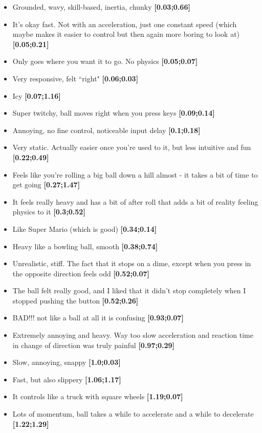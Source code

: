 \begin{itemize}[noitemsep,nolistsep]
\item Grounded, wavy, skill-based, inertia, chunky \textbf{[0.03;0.66]}
\item It's okay fast. Not with an acceleration, just one constant speed (which maybe makes it easier to control but then again more boring to look at) \textbf{[0.05;0.21]}
\item Only goes where you want it to go. No physics \textbf{[0.05;0.07]}
\item Very responsive, felt ``right" \textbf{[0.06;0.03]}
\item Icy \textbf{[0.07;1.16]}
\item Super twitchy, ball moves right when you press keys \textbf{[0.09;0.14]}
\item Annoying, no fine control, noticeable input delay \textbf{[0.1;0.18]}
\item Very static. Actually easier once you're used to it, but less intuitive and fun \textbf{[0.22;0.49]}
\item Feels like you're rolling a big ball down a hill almost - it takes a bit of time to get going \textbf{[0.27;1.47]}
\item It feels really heavy and has a bit of after roll that adds a bit of reality feeling physics to it \textbf{[0.3;0.52]}
\item Like Super Mario (which is good) \textbf{[0.34;0.14]}
\item Heavy like a bowling ball, smooth \textbf{[0.38;0.74]}
\item Unrealistic, stiff. The fact that it stops on a dime, except when you press in the opposite direction feels odd \textbf{[0.52;0.07]}
\item The ball felt really good, and I liked that it didn't stop completely when I stopped pushing the button \textbf{[0.52;0.26]}
\item BAD!!! not like a ball at all it is confusing \textbf{[0.93;0.07]}
\item Extremely annoying and heavy. Way too slow acceleration and reaction time in change of direction was truly painful \textbf{[0.97;0.29]}
\item Slow, annoying, snappy \textbf{[1.0;0.03]}
\item Fast, but also slippery \textbf{[1.06;1.17]}
\item It controls like a truck with square wheels \textbf{[1.19;0.07]}
\item Lots of momentum, ball takes a while to accelerate and a while to decelerate \textbf{[1.22;1.29]}

\end{itemize}
